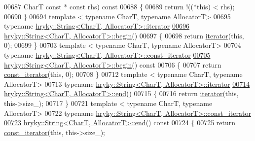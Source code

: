 \begin{DoxyCode}
00687     CharT \textcolor{keyword}{const} * \textcolor{keyword}{const} rhs)\textcolor{keyword}{ const}
00688 \textcolor{keyword}{}\{
00689     \textcolor{keywordflow}{return} !((*this) < rhs);
00690 \}
00694 \textcolor{keyword}{template} < \textcolor{keyword}{typename} CharT, \textcolor{keyword}{typename} AllocatorT>
00695 \textcolor{keyword}{typename} \hyperlink{classhryky_1_1iterator_1_1random_1_1_mutable}{hryky::String<CharT, AllocatorT>::iterator}
\hypertarget{string_8h_source_l00696}{}\hyperlink{classhryky_1_1_string_a92a226785218c05625b4b7278dcfc2bc}{00696} \hyperlink{classhryky_1_1_string}{hryky::String<CharT, AllocatorT>::begin}()
00697 \{
00698     \textcolor{keywordflow}{return} \hyperlink{classhryky_1_1iterator_1_1random_1_1_mutable}{iterator}(\textcolor{keyword}{this}, 0);
00699 \}
00703 \textcolor{keyword}{template} < \textcolor{keyword}{typename} CharT, \textcolor{keyword}{typename} AllocatorT>
00704 \textcolor{keyword}{typename} \hyperlink{classhryky_1_1iterator_1_1random_1_1_immutable}{hryky::String<CharT, AllocatorT>::const_iterator}
\hypertarget{string_8h_source_l00705}{}\hyperlink{classhryky_1_1_string_a7f2317d6159493bd53dfeacaaa681022}{00705} \hyperlink{classhryky_1_1_string}{hryky::String<CharT, AllocatorT>::begin}()\textcolor{keyword}{ const}
00706 \textcolor{keyword}{}\{
00707     \textcolor{keywordflow}{return} \hyperlink{classhryky_1_1iterator_1_1random_1_1_immutable}{const_iterator}(\textcolor{keyword}{this}, 0);
00708 \}
00712 \textcolor{keyword}{template} < \textcolor{keyword}{typename} CharT, \textcolor{keyword}{typename} AllocatorT>
00713 \textcolor{keyword}{typename} \hyperlink{classhryky_1_1iterator_1_1random_1_1_mutable}{hryky::String<CharT, AllocatorT>::iterator}
\hypertarget{string_8h_source_l00714}{}\hyperlink{classhryky_1_1_string_a2830c2985a440d5cb2ab58d81d7ec941}{00714} \hyperlink{classhryky_1_1_string}{hryky::String<CharT, AllocatorT>::end}()
00715 \{
00716     \textcolor{keywordflow}{return} \hyperlink{classhryky_1_1iterator_1_1random_1_1_mutable}{iterator}(\textcolor{keyword}{this}, this->size\_);
00717 \}
00721 \textcolor{keyword}{template} < \textcolor{keyword}{typename} CharT, \textcolor{keyword}{typename} AllocatorT>
00722 \textcolor{keyword}{typename} \hyperlink{classhryky_1_1iterator_1_1random_1_1_immutable}{hryky::String<CharT, AllocatorT>::const_iterator}
\hypertarget{string_8h_source_l00723}{}\hyperlink{classhryky_1_1_string_aeb43f91d3bb9badde257256d7c84e155}{00723} \hyperlink{classhryky_1_1_string}{hryky::String<CharT, AllocatorT>::end}()\textcolor{keyword}{ const}
00724 \textcolor{keyword}{}\{
00725     \textcolor{keywordflow}{return} \hyperlink{classhryky_1_1iterator_1_1random_1_1_immutable}{const_iterator}(\textcolor{keyword}{this}, this->size\_);

\end{DoxyCode}
